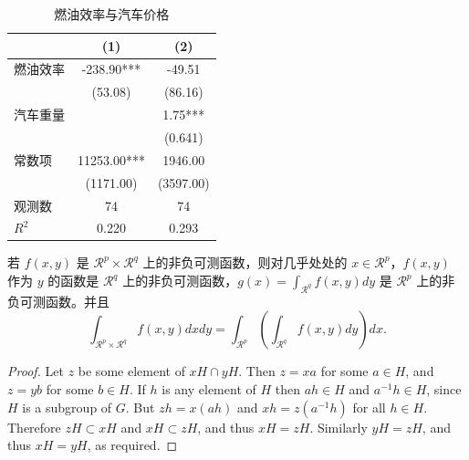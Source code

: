 \documentclass[cn,hazy,blue,14pt,normal]{elegantnote}
\begin{document}
\begin{table}[htbp]
  \centering
  \small
  \caption{燃油效率与汽车价格}
    \begin{tabular}{lcc}
    \toprule
                  &       (1)         &        (2)      \\
    \midrule
    燃油效率      &   -238.90***      &      -49.51     \\
                  &    (53.08)        &      (86.16)    \\
    汽车重量      &                   &        1.75***  \\
                  &                   &       (0.641)   \\
    常数项        &  11253.00***      &    1946.00      \\
                  &  (1171.00)        &   (3597.00)     \\
    观测数        &     74            &      74         \\
    $R^2$         &      0.220        &       0.293     \\
    \bottomrule
    \end{tabular}%
  \label{tab:reg}%
\end{table}%

\begin{theorem}[Fubini 定理]\label{thm:fubi}
若 $f(x,y)$ 是 $\mathcal{R}^p\times\mathcal{R}^q$ 上的非负可测函数，则对几乎处处的 $x\in \mathcal{R}^p$，$f(x,y)$ 作为 $y$ 的函数是 $\mathcal{R}^q$ 上的非负可测函数，$g(x)=\int_{\mathcal{R}^q}f(x,y) dy$ 是 $\mathcal{R}^p$ 上的非负可测函数。并且
\begin{equation}\label{eq:461}
  \int_{\mathcal{R}^p\times\mathcal{R}^q} f(x,y) dxdy=\int_{\mathcal{R}^p}\left(\int_{\mathcal{R}^q}f(x,y)dy\right)dx.
\end{equation}
\end{theorem}

\begin{proof}
Let $z$ be some element of $xH \cap yH$.  Then $z = xa$ for some $a \in H$, and $z = yb$ for some $b \in H$. If $h$ is any element of $H$ then $ah \in H$ and $a^{-1}h \in H$, since $H$ is a subgroup of $G$. But $zh = x(ah)$ and $xh = z(a^{-1}h)$ for all $h \in H$. Therefore $zH \subset xH$ and $xH \subset zH$, and thus $xH = zH$.  Similarly $yH = zH$, and thus $xH = yH$, as required.
\end{proof}
\end{document}
